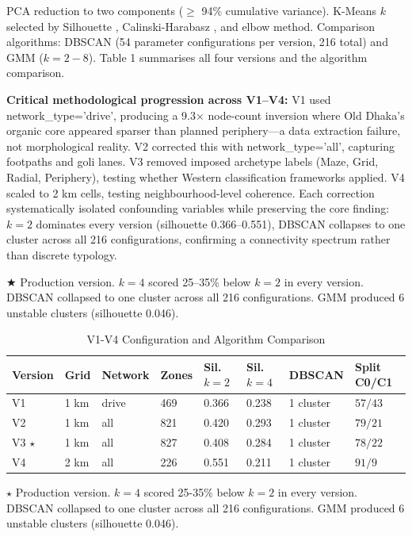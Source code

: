 \documentclass[sigconf, nonacm]{acmart}
\begin{document}
PCA reduction to two components ($\geq$ 94\% cumulative variance). K-Means $k$ selected by Silhouette \cite{rousseeuw1987}, Calinski-Harabasz \cite{calinski1974}, and elbow method. Comparison algorithms: DBSCAN (54 parameter configurations per version, 216 total) and GMM ($k = 2 - 8$). Table 1 summarises all four versions and the algorithm comparison.

\textbf{Critical methodological progression across V1--V4:} V1 used network\_type='drive', producing a 9.3$\times$ node-count inversion where Old Dhaka's organic core appeared sparser than planned periphery—a data extraction failure, not morphological reality. V2 corrected this with network\_type='all', capturing footpaths and goli lanes. V3 removed imposed archetype labels (Maze, Grid, Radial, Periphery), testing whether Western classification frameworks applied. V4 scaled to 2 km cells, testing neighbourhood-level coherence. Each correction systematically isolated confounding variables while preserving the core finding: $k = 2$ dominates every version (silhouette 0.366--0.551), DBSCAN collapses to one cluster across all 216 configurations, confirming a connectivity spectrum rather than discrete typology.

★ Production version. $k = 4$ scored 25--35\% below $k = 2$ in every version. DBSCAN collapsed to one cluster across all 216 configurations. GMM produced 6 unstable clusters (silhouette 0.046).

\begin{table}[t]
\caption{V1-V4 Configuration and Algorithm Comparison}
\begin{tabular}{llllllll}
\toprule
Version & Grid & Network & Zones & Sil. $k=2$ & Sil. $k=4$ & DBSCAN & Split C0/C1 \\
\midrule
V1 & 1 km & drive & 469 & 0.366 & 0.238 & 1 cluster & $57/43$ \\
V2 & 1 km & all & 821 & 0.420 & 0.293 & 1 cluster & $79/21$ \\
V3 $\star$ & 1 km & all & 827 & 0.408 & 0.284 & 1 cluster & $78/22$ \\
V4 & 2 km & all & 226 & 0.551 & 0.211 & 1 cluster & $91/9$ \\
\bottomrule
\end{tabular}
\end{table}

$\star$ Production version. $k=4$ scored 25-35\% below $k=2$ in every version. DBSCAN collapsed to one cluster across all 216 configurations. GMM produced 6 unstable clusters (silhouette 0.046).
\end{document}
